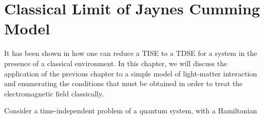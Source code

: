 \chapter[Semi-Classics of Jaynes-Cumming]{Classical Limit of Jaynes Cumming Model\label{chap:braun_briggs_jaynes}}

It has been shown in how one can reduce a TISE to a TDSE for a system in the presence of a classical environment. In this chapter, we will discuss the application of the previous chapter to a simple model of light-matter interaction and enumerating the conditions that must be obtained in order to treat the electromagnetic field classically.

Consider a time-independent problem of a quantum system, with a Hamiltonian 

